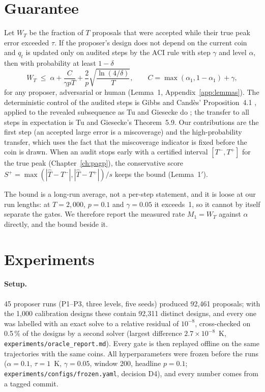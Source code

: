 \section{Guarantee}
\label{sec:dl-guarantee}
Let $W_T$ be the fraction of $T$ proposals that were accepted while their true peak error exceeded
$\tau$. If the proposer's design does not depend on the current coin and $q_t$ is updated only on
audited steps by the ACI rule with step $\gamma$ and level $\alpha$, then with probability at
least $1-\delta$
\[
  W_T \;\le\; \alpha + \frac{C}{\gamma p T} + \frac{2}{p}\sqrt{\frac{\ln(4/\delta)}{T}},
  \qquad C = \max(\alpha_1, 1-\alpha_1) + \gamma ,
\]
for any proposer, adversarial or human (Lemma~1, Appendix~\ref{app:lemmas}). The deterministic
control of the audited steps is Gibbs and Cand\`es' Proposition~4.1 \cite{gibbs2021aci}, applied
to the revealed subsequence as Tu and Giesecke do \cite{tu2026}; the transfer to all steps in
expectation is Tu and Giesecke's Theorem~5.9. Our contributions are the first step (an accepted
large error is a miscoverage) and the high-probability transfer, which uses the fact that the
miscoverage indicator is fixed before the coin is drawn. When an audit stops early with a
certified interval $[T^-,T^+]$ for the true peak (Chapter~\ref{ch:pagp}), the conservative score
$S^+ = \max(|\hat T - T^-|, |\hat T - T^+|)/s$ keeps the bound (Lemma~1$'$).

The bound is a long-run average, not a per-step statement, and it is loose at our run lengths:
at $T = 2{,}000$, $p = 0.1$ and $\gamma = 0.05$ it exceeds~1, so it cannot by itself separate
the gates. %
We therefore report the measured rate $M_1 = W_T$ against $\alpha$ directly, and the bound beside
it.

\section{Experiments}
\label{sec:dl-experiments}
\paragraph{Setup.} 45 proposer runs (P1--P3, three levels, five seeds) produced 92{,}461
proposals; %
with the 1{,}000 calibration designs these contain 92{,}311 distinct designs,
and every one was labelled with an exact solve to a relative residual of $10^{-8}$, cross-checked on 0.5\,\% of the designs by a second solver (largest
difference $2.7\times10^{-8}$~K, \texttt{experiments/oracle\_report.md}). Every gate is then
replayed offline on the same trajectories with the same coins. All hyperparameters were frozen
before the runs ($\alpha = 0.1$, $\tau = 1$~K, $\gamma = 0.05$, window 200, headline $p = 0.1$;
\texttt{experiments/configs/frozen.yaml}, decision D4), and every number comes from a tagged
commit.


